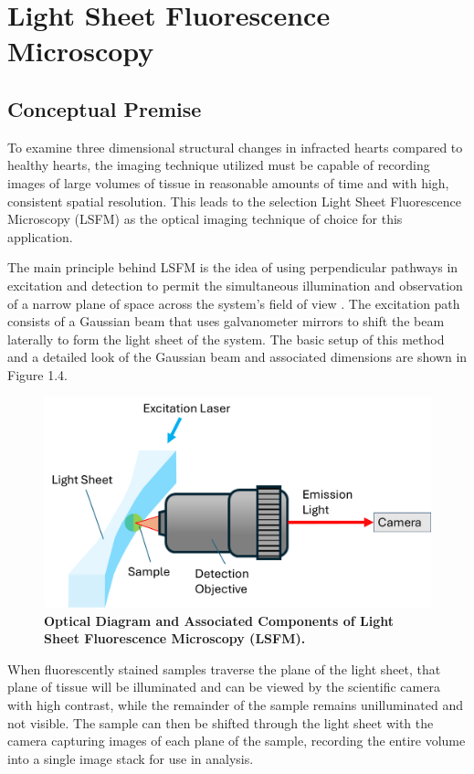 \section{Light Sheet Fluorescence Microscopy}

\subsection{Conceptual Premise}
To examine three dimensional structural changes in infracted hearts compared to healthy hearts, the imaging technique utilized must be capable of recording images of large volumes of tissue in reasonable amounts of time and with high, consistent spatial resolution. This leads to the selection Light Sheet Fluorescence Microscopy (LSFM) as the optical imaging technique of choice for this application.  

The main principle behind LSFM is the idea of using perpendicular pathways in excitation and detection to permit the simultaneous illumination and observation of a narrow plane of space across the system’s field of view \cite{voigt_mesospim_2019}. The excitation path consists of a Gaussian beam that uses galvanometer mirrors to shift the beam laterally to form the light sheet of the system. The basic setup of this method and a detailed look of the Gaussian beam and associated dimensions are shown in Figure 1.4.

\begin{figure}[H]
    \centering
    \includegraphics[width=0.75\linewidth]{Figures/Figure1.4.png}
    \caption{\textbf{Optical Diagram and Associated Components of Light Sheet Fluorescence Microscopy (LSFM).}}
    \label{fig:enter-label}
\end{figure}

When fluorescently stained samples traverse the plane of the light sheet, that plane of tissue will be illuminated and can be viewed by the scientific camera with high contrast, while the remainder of the sample remains unilluminated and not visible. The sample can then be shifted through the light sheet with the camera capturing images of each plane of the sample, recording the entire volume into a single image stack for use in analysis.

